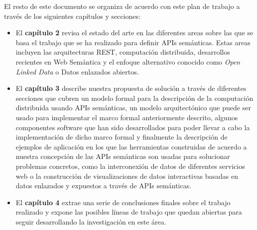 El resto de este documento se organiza de acuerdo con este plan de trabajo a trav\'es de los siguientes cap\'itulos y secciones:

\begin{itemize}
  \item El \textbf{cap\'itulo 2} revisa el estado del arte en las diferentes areas sobre las que se basa el trabajo que se ha realizado para definir APIs sem\'anticas. Estas areas incluyen las arquitecturas REST, computaci\'on distribuida, desarrollos recientes en Web Sem\'antica y el enfoque alternativo conocido como \textit{Open Linked Data} o Datos enlazados abiertos.
  \item El \textbf{cap\'itulo 3} describe nuestra propuesta de soluci\'on a trav\'es de diferentes secciones que cubren un modelo formal para la descripci\'on de la computaci\'on distribuida usando APIs sem\'anticas, un modelo arquitect\'onico que puede ser usado para implementar el marco formal anteriormente descrito, algunos componentes software que han sido desarrollados para poder llevar a cabo la implementaci\'on de dicho marco formal y finalmente la descripci\'on de ejemplos de aplicaci\'on en los que las herramientas construidas de acuerdo a nuestra concepci\'on de las APIs sem\'anticas son usadas para solucionar problemas concretos, como la interconexi\'on de datos de diferentes servicios web o la construcci\'on de visualizaciones de datos interactivas basadas en datos enlazados y expuestos a trav\'es de APIs sem\'anticas.
  \item El \textbf{cap\'itulo 4} extrae una serie de conclusiones finales sobre el trabajo realizado y expone las posibles l\'ineas de trabajo que quedan abiertas para seguir desarrollando la investigaci\'on en este \'area.
\end{itemize}